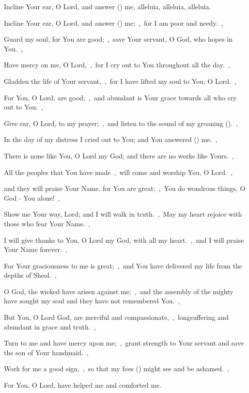 \documentclass[12pt,twoside,a5paper]{article}
\begin{document}
\begin{halfparskip}
  Incline Your ear, O Lord, and answer () me, alleluia, alleluia, alleluia.

  Incline Your ear, O Lord, and answer () me;~\sep\ for I am poor and needy.~\sep

  Guard my soul, for You are good;~\sep\ save Your servant, O God, who hopes in You.~\sep

  Have mercy on me, O Lord,~\sep\ for I cry out to You throughout all the day.~\sep

  Gladden the life of Your servant,~\sep\ for I have lifted my soul to You, O Lord.~\sep

  For You, O Lord, are good;~\sep\ and abundant is Your grace towards all who cry out to You.~\sep

  Give ear, O Lord, to my prayer;~\sep\ and listen to the sound of my groaning ().~\sep

  In the day of my distress I cried out to You; and You answered () me.~\sep

  There is none like You, O Lord my God; and there are no works like Yours.~\sep

  All the peoples that You have made~\sep\ will come and worship You, O Lord.~\sep

  and they will praise Your Name, for You are great;~\sep\ You do wondrous things, O God - You alone!~\sep

  Show me Your way, Lord; and I will walk in truth.~\sep\ May my heart rejoice with those who fear Your Name.~\sep

  I will give thanks to You, O Lord my God, with all my heart.~\sep\ and I will praise Your Name forever.~\sep

  For Your graciousness to me is great;~\sep\ and You have delivered my life from the depths of Sheol.~\sep

  O God, the wicked have arisen against me;~\sep\ and the assembly of the mighty have sought my soul and they have not remembered You.~\sep

  But You, O Lord God, are merciful and compassionate,~\sep\ longsuffering and abundant in grace and truth.~\sep

  Turn to me and have mercy upon me;~\sep\ grant strength to Your servant and save the son of Your handmaid.~\sep

  Work for me a good sign,~\sep\ so that my foes () might see and be ashamed.~\sep

  For You, O Lord, have helped me and comforted me.
\end{halfparskip}
\end{document}
